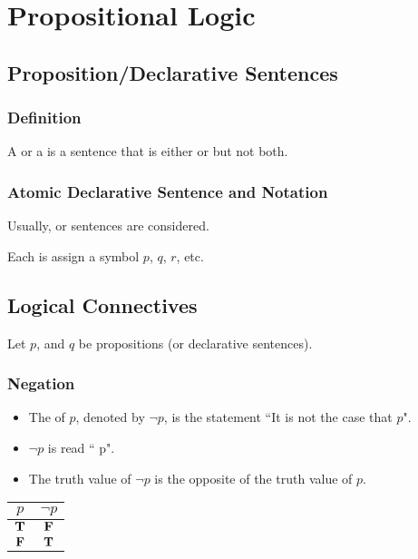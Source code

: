 \chapter{Propositional Logic}

\section{Proposition/Declarative Sentences}
  \subsection{Definition}
  \par A  or a  is a sentence that is either  or  but not both.

  \subsection{Atomic Declarative Sentence and Notation}
  \par Usually,  or  sentences are considered.
  \par Each  is assign a symbol $p$, $q$, $r$, etc.

\section{Logical Connectives}
  \par {}
  \par Let $p$, and $q$ be propositions (or declarative sentences).

  \subsection{Negation}
      \begin{itemize}
        \item The  of $p$, denoted by $\lnot p$, is the statement ``It is not the case that $p$".
        \item $\lnot p$ is read `` p".
        \item The truth value of $\lnot p$ is the opposite of the truth value of $p$.
      \end{itemize}
      \begin{center}
        \begin{tabular}{|c|c|}
          \hline
          $p$ & $\lnot p$ \\
          \hline
          $\mathbf{T}$ & $\mathbf{F}$ \\
          \hline
          $\mathbf{F}$ & $\mathbf{T}$ \\
          \hline
        \end{tabular}
      \end{center}

